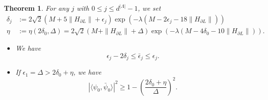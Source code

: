 \documentclass[11pt]{article}
\numberwithin{equation}{section}
\newtheorem{theorem}{Theorem}[section]
\begin{document}
\begin{theorem}\label{thm_main2_finite}
For any $j$ with $0\leq j\leq d^{|\Lambda|}-1$, we set
\begin{align*}
\delta_j&:=2\sqrt{2}(M+5\|H_{\partial L}\|+\epsilon_j) \exp(-\lambda(M-2\epsilon_j-18\|H_{\partial L}\|))\\
\eta&:=\eta(2\delta_0,\Delta)=2\sqrt{2}(M+\|H_{\partial L}\|+\Delta)\exp(-\lambda(M-4\delta_0-10\|H_{\partial L}\|)).
\end{align*}
\begin{itemize}
\item[(i)] We have
\[
\epsilon_j-2\delta_j\leq \bar{\epsilon}_j\leq \epsilon_j.
\]
\item[(ii)] If $\epsilon_1=\Delta>2\delta_0+\eta$, we have
\[
|\langle\psi_0,\bar{\psi}_0\rangle|^2\geq 1-\left(\frac{2\delta_0+\eta}{\Delta}\right)^2.
\]
\end{itemize}
\end{theorem}
\end{document}
